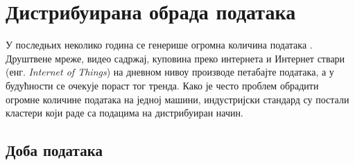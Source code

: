 \documentclass[12pt,oneside]{memoir}
\begin{document}


\chapter{Дистрибуирана обрада података}
\label{chp:dist_sis}

У последњих неколико година се генерише огромна количина података \cite{volume_data}. Друштвене мреже, видео садржај, куповина преко интернета и Интернет ствари (енг. \textit{Internet of Things}) на дневном нивоу производе петабајте података, а у будућности се очекује пораст тог тренда. Како је често проблем обрадити огромне количине података на једној машини, индустријски стандард су постали кластери који раде са подацима на дистрибуиран начин.

\begin{comment}

\begin{center}
\begin{tabular}{|c|c|}
	\hline
 	Мерна јединица меморије & Вредност \\ \hline
	Бит & 0 или 1 \\ \hline
	Бајт & 8 бита \\ \hline 	
 	Килобајт & 1024 бајта \\ \hline
 	Мегабајт & 1024 килобајта \\ \hline
 	Гигабајт & 1024 мегабајта \\ \hline
 	Терабајт & 1024 гигабајта \\ \hline
 	Петабајт & 1024 терабајта \\ \hline
 	Егзабајт & 1024 петабајта \\ \hline
\end{tabular}
\end{center}

\end{comment}


\section{Доба података} %
\label{sec:dist_motivacija}
\end{document}
